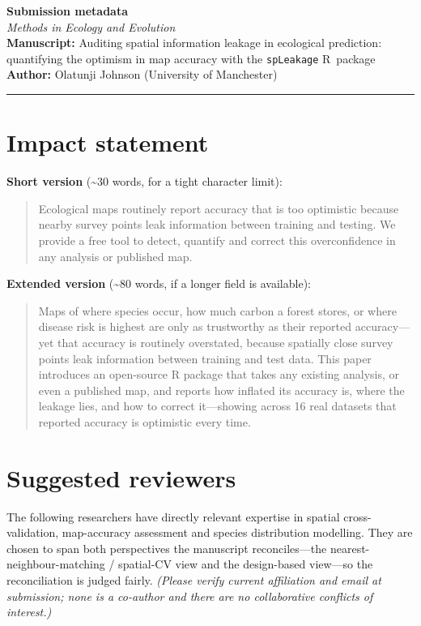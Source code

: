 \documentclass[11pt,a4paper]{article}
\newcommand{\mstitle}{Auditing spatial information leakage in ecological prediction:
quantifying the optimism in map accuracy with the \texttt{spLeakage} R~package}
\begin{document}
\begin{center}
{\large\bfseries Submission metadata}\\[2pt]
\emph{Methods in Ecology and Evolution}\\[6pt]
\textbf{Manuscript:} \mstitle\\
\textbf{Author:} Olatunji Johnson (University of Manchester)
\end{center}

\hrule
\bigskip

\section*{Impact statement}

\textbf{Short version} (\textasciitilde30 words, for a tight character limit):

\begin{quote}
Ecological maps routinely report accuracy that is too optimistic because nearby
survey points leak information between training and testing. We provide a free tool to
detect, quantify and correct this overconfidence in any analysis or published map.
\end{quote}

\textbf{Extended version} (\textasciitilde80 words, if a longer field is available):

\begin{quote}
Maps of where species occur, how much carbon a forest stores, or where disease risk
is highest are only as trustworthy as their reported accuracy---yet that accuracy is
routinely overstated, because spatially close survey points leak information between
training and test data. This paper introduces an open-source R package that takes any
existing analysis, or even a published map, and reports how inflated its accuracy is,
where the leakage lies, and how to correct it---showing across 16 real datasets that
reported accuracy is optimistic every time.
\end{quote}

\section*{Suggested reviewers}

The following researchers have directly relevant expertise in spatial
cross-validation, map-accuracy assessment and species distribution modelling. They are
chosen to span both perspectives the manuscript reconciles---the
nearest-neighbour-matching / spatial-CV view and the design-based view---so the
reconciliation is judged fairly. \emph{(Please verify current affiliation and email at
submission; none is a co-author and there are no collaborative conflicts of
interest.)}
\end{document}
